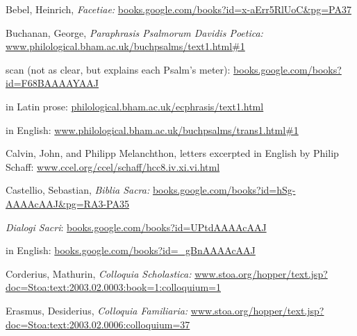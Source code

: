 \documentclass[20pt, twoside]{extarticle}
\begin{document}
\begin{singlespace}
\begin{en}

\hi Bebel, Heinrich, \emph{Facetiae:} \url{books.google.com/books?id=x-aErr5RlUoC&pg=PA37}


\hi Buchanan, George, \emph{Paraphrasis Psalmorum Davidis Poetica:} \url{www.philological.bham.ac.uk/buchpsalms/text1.html#1}

\hi\dashes scan (not as clear, but explains each Psalm’s meter): \href{https://books.google.com/books?id=F68BAAAAYAAJ&pg=PA1}{books.google.com/books?id=F68BAAAAYAAJ}

\hi\dashes in Latin prose: \url{philological.bham.ac.uk/ecphrasis/text1.html}

\hi\dashes in English: \url{www.philological.bham.ac.uk/buchpsalms/trans1.html#1}



\hi Calvin, John, and Philipp Melanchthon, letters excerpted in English by Philip Schaff: \url{www.ccel.org/ccel/schaff/hcc8.iv.xi.vi.html}

\hi Castellio, Sebastian, \emph{Biblia Sacra:} \url{books.google.com/books?id=hSg-AAAAcAAJ&pg=RA3-PA35}

\hi\dash \emph{Dialogi Sacri}: \href{https://books.google.com/books?id=UPtdAAAAcAAJ&pg=PA1}{books.google.com/books?id=UPtdAAAAcAAJ}

\hi\dashes in English: \href{https://books.google.com/books?id=_gBnAAAAcAAJ&pg=PA1}{books.google.com/books?id=\_gBnAAAAcAAJ}

\hi Corderius, Mathurin, \emph{Colloquia Scholastica:} \url{www.stoa.org/hopper/text.jsp?doc=Stoa:text:2003.02.0003:book=1:colloquium=1}


\hi Erasmus, Desiderius, \emph{Colloquia Familiaria:} \href{www.stoa.org/hopper/text.jsp?doc=Stoa:text:2003.02.0006:colloquium=37}{www.stoa.org/\linebreak hopper/text.jsp?doc=Stoa:text:2003.02.0006:colloquium=37}


\end{en}
\end{singlespace}
\end{document}
